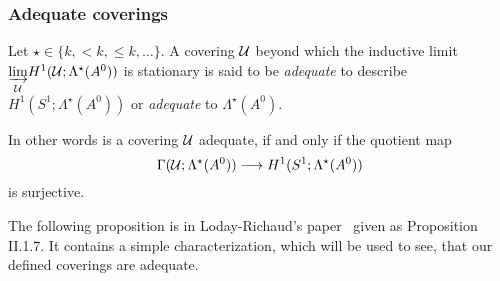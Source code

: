 \subsubsection{Adequate coverings}
\begin{defn}
  Let $\star\in\{k,<k,\leq k,\dots\}$.
  A covering $\mathcal{U}$ beyond which the inductive limit
  $\underset{\mathcal{U}}{\underrightarrow{\lim}}H^1(\mathcal{U};\Lambda^\star(A^0))$ is
  stationary is said to be \emph{adequate} to describe
  $H^1(S^1;\Lambda^\star(A^0))$ or \emph{adequate} to $\Lambda^\star(A^0)$.
  \begin{comment}
    A covering $\cU$ is said to be \emph{adequate} to describe
    $H^1(S^1;\Lambda^\star(A^0))$ or \emph{adequate} to $\Lambda^\star(A^0)$ if
    for every element in
    $\underset{\cU}{\underrightarrow{\lim}}H^1(\cU;\Lambda^\star(A^0))$
    given by some covering $\cU'$ and an element of
    $\Gamma(\cU';\Lambda^\star(A^0))$
    there exists
    \begin{itemize}
      \item an element in $\Gamma(\cU;\Lambda^\star(A^0))$ and
      \item an common refinement of $\cU$ and $\cU'$
    \end{itemize}
    such that \PROBLEM[the elements are~?? on the refined covering.]
  \end{comment}

  In other words is a covering $\mathcal{U}$ adequate, if and only if the quotient map
  \[
      \Gamma(\mathcal{U};\Lambda^\star(A^0))\longrightarrow H^1(S^1;\Lambda^\star(A^0))
  \]
  is surjective.
  \begin{comment}
    \cite[371]{Martinet1991} introduces the following definition
    \begin{s-defn}
      A covering $\cU$ is \emph{adapted} if every anti-Stokes direction is
      contained in exactly one element of the nerve $\dot\cU$.
    \end{s-defn}
  \end{comment}
\end{defn}
The following proposition is in Loday-Richaud's paper~\cite{Loday1994} given as
Proposition II.1.7. It contains a simple characterization, which will be used
to see, that our defined coverings are adequate.
